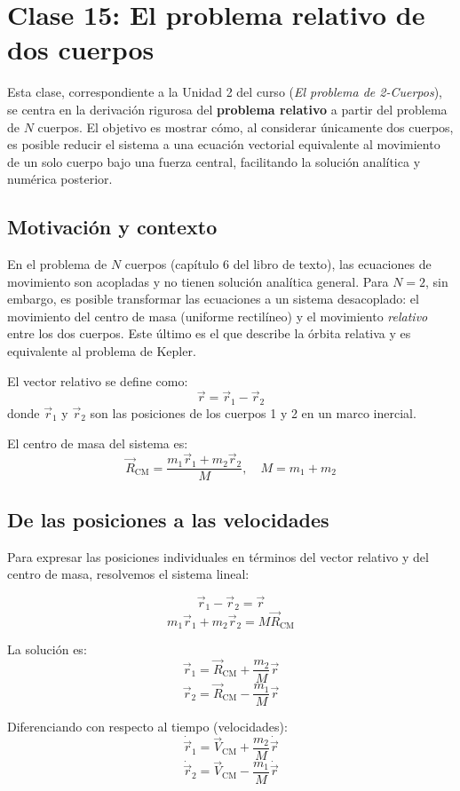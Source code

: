\chapter{Clase 15: El problema relativo de dos cuerpos}

Esta clase, correspondiente a la Unidad 2 del curso (\emph{El problema de 2-Cuerpos}), se centra en la derivación rigurosa del \textbf{problema relativo} a partir del problema de \(N\) cuerpos. El objetivo es mostrar cómo, al considerar únicamente dos cuerpos, es posible reducir el sistema a una ecuación vectorial equivalente al movimiento de un solo cuerpo bajo una fuerza central, facilitando la solución analítica y numérica posterior.

\section{Motivación y contexto}
En el problema de \(N\) cuerpos (capítulo 6 del libro de texto), las ecuaciones de movimiento son acopladas y no tienen solución analítica general. Para \(N=2\), sin embargo, es posible transformar las ecuaciones a un sistema desacoplado: el movimiento del centro de masa (uniforme rectilíneo) y el movimiento \emph{relativo} entre los dos cuerpos. Este último es el que describe la órbita relativa y es equivalente al problema de Kepler.

El vector relativo se define como:
\[
\vec{r} = \vec{r}_1 - \vec{r}_2
\]
donde \(\vec{r}_1\) y \(\vec{r}_2\) son las posiciones de los cuerpos 1 y 2 en un marco inercial.

El centro de masa del sistema es:
\[
\vec{R}_{\text{CM}} = \frac{m_1 \vec{r}_1 + m_2 \vec{r}_2}{M}, \quad M = m_1 + m_2
\]

\section{De las posiciones a las velocidades}
Para expresar las posiciones individuales en términos del vector relativo y del centro de masa, resolvemos el sistema lineal:

\[
\vec{r}_1 - \vec{r}_2 = \vec{r}
\]
\[
m_1 \vec{r}_1 + m_2 \vec{r}_2 = M \vec{R}_{\text{CM}}
\]

La solución es:
\[
\vec{r}_1 = \vec{R}_{\text{CM}} + \frac{m_2}{M} \vec{r}
\]
\[
\vec{r}_2 = \vec{R}_{\text{CM}} - \frac{m_1}{M} \vec{r}
\]

Diferenciando con respecto al tiempo (velocidades):
\[
\dot{\vec{r}}_1 = \vec{V}_{\text{CM}} + \frac{m_2}{M} \dot{\vec{r}}
\]
\[
\dot{\vec{r}}_2 = \vec{V}_{\text{CM}} - \frac{m_1}{M} \dot{\vec{r}}
\]

